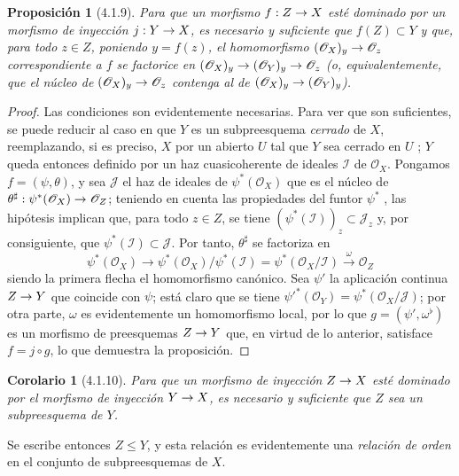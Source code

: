 \documentclass[oneside]{amsart}
\theoremstyle{ega-env-style}
\theoremstyle{ega-thm-env-style}
\newtheorem*{proposition}{Proposición}
\newtheorem*{corollary}{Corolario}
\theoremstyle{ega-defn-env-style}
\def\leq{\leqslant}                 %
\renewcommand{\to}{\mathchoice{\longrightarrow}{\rightarrow}{\rightarrow}{\rightarrow}}
\newcommand{\oldpage}[2][]{{\marginnote{\normalfont{\textbf{#1}~|~#2}}}\ignorespaces}
\let\EGAOriginalLabel\label
\renewcommand{\label}[1]{\phantomsection\EGAOriginalLabel{#1}}
\begin{document}
\begin{proposition}[4.1.9]
\label{I.4.1.9}
Para que un morfismo $f:Z\to X$ esté dominado por un morfismo de inyección $j:Y\to X$, es necesario y suficiente que $f(Z)\subset Y$ y que, para todo $z\in Z$, poniendo $y=f(z)$, el homomorfismo $(\mathscr{O}_X)_y\to\mathscr{O}_z$ correspondiente a $f$ se factorice en $(\mathscr{O}_X)_y\to(\mathscr{O}_Y)_y\to\mathscr{O}_z$ (\textup{o, equivalentemente, que} el núcleo de $(\mathscr{O}_X)_y\to\mathscr{O}_z$ contenga al de $(\mathscr{O}_X)_y\to(\mathscr{O}_Y)_y$).
\end{proposition}

\begin{proof}
Las condiciones son evidentemente necesarias.
Para ver que son suficientes, se puede reducir al caso en que $Y$ es un subpreesquema \emph{cerrado} de $X$, reemplazando, si es preciso, $X$ por un abierto $U$ tal que $Y$ sea cerrado en $U$ ;
$Y$ queda entonces definido por un haz cuasicoherente de ideales $\mathscr{I}$ de $\mathscr{O}_X$.
Pongamos $f=(\psi,\theta)$, y sea $\mathscr{J}$ el haz de ideales de $\psi^*(\mathscr{O}_X)$ que es el núcleo de $\theta^\sharp:\psi^*(\mathscr{O}_X)\to\mathscr{O}_Z$;
teniendo en cuenta las propiedades del funtor $\psi^*$ , las hipótesis implican que, para todo $z\in Z$, se tiene $(\psi^*(\mathscr{I}))_z\subset\mathscr{J}_z$ y, por consiguiente, que $\psi^*(\mathscr{I})\subset\mathscr{J}$.
Por tanto, $\theta^\sharp$ se factoriza en
\[
  \psi^*(\mathscr{O}_X)\longrightarrow
  \psi^*(\mathscr{O}_X)/\psi^*(\mathscr{I})
  =\psi^*(\mathscr{O}_X/\mathscr{I})
  \xrightarrow{\omega}\mathscr{O}_Z
\]
siendo la primera flecha el homomorfismo canónico.
Sea $\psi'$ la aplicación continua $Z\to Y$ que coincide con $\psi$;
está claro que se tiene ${\psi'}^*(\mathscr{O}_Y)=\psi^*(\mathscr{O}_X/\mathscr{J})$;
por otra parte, $\omega$ es evidentemente un homomorfismo local, por lo que $g=(\psi',\omega^\flat)$ es un morfismo
\oldpage[I]{122}
de preesquemas $Z\to Y$  que, en virtud de lo anterior, satisface $f=j\circ g$, lo que demuestra la proposición.
\end{proof}

\begin{corollary}[4.1.10]
\label{I.4.1.10}
Para que un morfismo de inyección $Z\to X$ esté dominado por el morfismo de inyección $Y\to X$, es necesario y suficiente que $Z$ sea un subpreesquema de $Y$.
\end{corollary}

Se escribe entonces $Z\leq Y$, y esta relación es evidentemente una \emph{relación de orden} en el conjunto de subpreesquemas de $X$.
\end{document}
